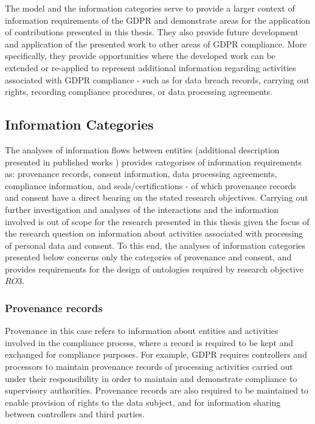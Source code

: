 The model and the information categories serve to provide a larger context of information requirements of the GDPR and demonstrate areas for the application of contributions presented in this thesis. They also provide future development and application of the presented work to other areas of GDPR compliance. More specifically, they provide opportunities where the developed work can be extended or re-applied to represent additional information regarding activities associated with GDPR compliance - such as for data breach records, carrying out rights, recording compliance procedures, or data processing agreements.

\subsection*{Information Categories}
The analyses of information flows between entities (additional description presented in published works \cite{pandit_exploration_2018,pandit_gdpr_2018}) provides categorises of information requirements as: provenance records, consent information, data processing agreements, compliance information, and seals/certifications - of which provenance records and consent have a direct bearing on the stated research objectives.
Carrying out further investigation and analyses of the interactions and the information involved is out of scope for the research presented in this thesis given the focus of the research question on information about activities associated with processing of personal data and consent.
To this end, the analyses of information categories presented below concerns only the categories of provenance and consent, and provides requirements for the design of ontologies required by research objective $RO3$.

\subsubsection*{Provenance records}
Provenance in this case refers to information about entities and activities involved in the compliance process, where a record is required to be kept and exchanged for compliance purposes. For example, GDPR requires controllers and processors to maintain provenance records of processing activities carried out under their responsibility in order to maintain and demonstrate compliance to supervisory authorities. Provenance records are also required to be maintained to enable provision of rights to the data subject, and for information sharing between controllers and third parties.

